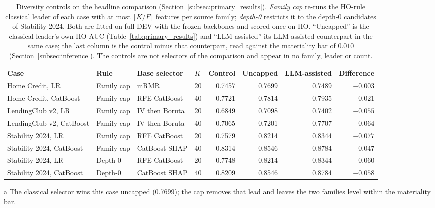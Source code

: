 \documentclass[final,5p,twocolumn]{elsarticle}
\newcommand{\Kfeat}{K}
\begin{document}
\begin{table}[htbp]
\centering
\footnotesize
\begin{threeparttable}
\caption{Diversity controls on the headline comparison (Section~\ref{subsec:primary_results}). \emph{Family cap} re-runs the HO-rule classical leader of each case with at most $\lceil \Kfeat/F\rceil$ features per source family; \emph{depth-0} restricts it to the depth-0 candidates of Stability 2024. Both are fitted on full DEV with the frozen backbones and scored once on HO. ``Uncapped'' is the classical leader's own HO AUC (Table~\ref{tab:primary_results}) and ``LLM-assisted'' its LLM-assisted counterpart in the same case; the last column is the control minus that counterpart, read against the materiality bar of $0.010$ (Section~\ref{subsec:inference}). The controls are not selectors of the comparison and appear in no family, leader or count.}
\label{tab:diversity}
\setlength{\tabcolsep}{5pt}
\begin{tabular}{@{}llllrrrr@{}}
\toprule
Case & Rule & Base selector & $\Kfeat$ & Control & Uncapped & LLM-assisted & Difference \\
\midrule
Home Credit, LR & Family cap & mRMR & 20 & 0.7457 & 0.7699 & 0.7489 & $-0.003$\tnote{a} \\
Home Credit, CatBoost & Family cap & RFE CatBoost & 40 & 0.7721 & 0.7814 & 0.7935 & $-0.021$ \\
LendingClub v2, LR & Family cap & IV then Boruta & 20 & 0.6849 & 0.7098 & 0.7402 & $-0.055$ \\
LendingClub v2, CatBoost & Family cap & IV then Boruta & 40 & 0.7065 & 0.7201 & 0.7707 & $-0.064$ \\
Stability 2024, LR & Family cap & RFE CatBoost & 20 & 0.7579 & 0.8214 & 0.8344 & $-0.077$ \\
Stability 2024, CatBoost & Family cap & CatBoost SHAP & 40 & 0.8314 & 0.8546 & 0.8784 & $-0.047$ \\
\addlinespace
Stability 2024, LR & Depth-0 & RFE CatBoost & 20 & 0.7748 & 0.8214 & 0.8344 & $-0.060$ \\
Stability 2024, CatBoost & Depth-0 & CatBoost SHAP & 40 & 0.8209 & 0.8546 & 0.8784 & $-0.058$ \\
\bottomrule
\end{tabular}
\begin{tablenotes}\footnotesize
\item[a] The classical selector wins this case uncapped (0.7699); the cap removes that lead and leaves the two families level within the materiality bar.
\end{tablenotes}
\end{threeparttable}
\end{table}
\end{document}
